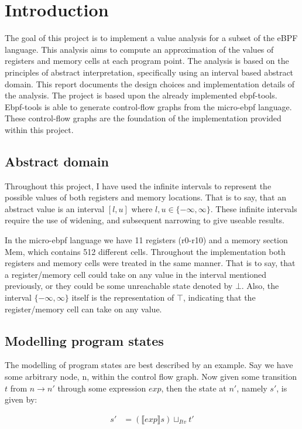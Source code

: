 \section{Introduction}
The goal of this project is to implement a value analysis for a subset of the
eBPF language. This analysis aims to compute an approximation of the values of
registers and memory cells at each program point. The analysis is based on the
principles of abstract interpretation, specifically using an interval based
abstract domain. This report documents the design choices and implementation
details of the analysis. The project is based upon the already implemented
ebpf-tools\cite{ebpf}. Ebpf-tools is able to generate control-flow graphs
from the micro-ebpf language. These control-flow graphs are the foundation of
the implementation provided within this project.

\subsection*{Abstract domain}
Throughout this project, I have used the infinite intervals to represent the
possible values of both registers and memory locations. That is to say, that an
abstract value is an interval $[l, u]$ where $l, u \in \{-\infty, \infty\}$.
These infinite intervals require the use of widening, and subsequent narrowing
to give useable results.

In the micro-ebpf language we have 11 registers (r0-r10) and a memory section
Mem, which contains 512 different cells. Throughout the implementation both
registers and memory cells were treated in the same manner. That is to say,
that a register/memory cell could take on any value in the interval mentioned
previously, or they could be some unreachable state denoted by $\bot$. Also,
the interval $\{-\infty, \infty\}$ itself is the representation of $\top$,
indicating that the register/memory cell can take on any value.

\subsection*{Modelling program states}
The modelling of program states are best described by an example. Say we have
some arbitrary node, n, within the control flow graph. Now given some
transition $t$ from $n \to n'$ through some expression $exp$, then the state at
$n'$, namely $s'$, is given by:

\begin{align}
  s' &= (\llbracket exp \rrbracket s) \sqcup_{Itv} t'
\end{align}

